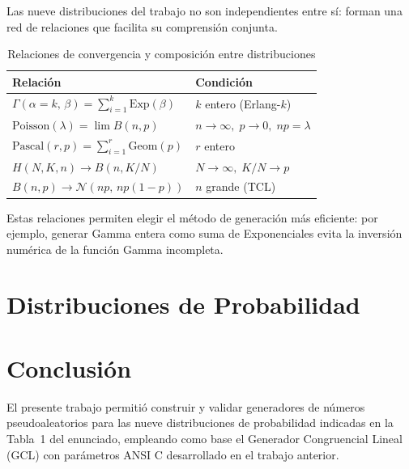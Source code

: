 \documentclass[a4paper, 11pt]{article}
\begin{document}
Las nueve distribuciones del trabajo no son independientes entre sí: forman una red
de relaciones que facilita su comprensión conjunta.

\begin{table}[H]
\centering
\begin{tabular}{ll}
\toprule
\textbf{Relación} & \textbf{Condición} \\
\midrule
$\Gamma(\alpha=k,\,\beta) = \sum_{i=1}^k \text{Exp}(\beta)$ &
    $k$ entero (Erlang-$k$) \\
$\text{Poisson}(\lambda) = \lim B(n, p)$ &
    $n \to \infty,\; p \to 0,\; np = \lambda$ \\
$\text{Pascal}(r, p) = \sum_{i=1}^r \text{Geom}(p)$ &
    $r$ entero \\
$H(N, K, n) \to B(n, K/N)$ &
    $N \to \infty,\; K/N \to p$ \\
$B(n, p) \to \mathcal{N}(np,\, np(1-p))$ &
    $n$ grande (TCL) \\
\bottomrule
\end{tabular}
\caption{Relaciones de convergencia y composición entre distribuciones}
\end{table}

Estas relaciones permiten elegir el método de generación más eficiente: por ejemplo,
generar Gamma entera como suma de Exponenciales evita la inversión numérica de la
función Gamma incompleta.

\newpage
\section{Distribuciones de Probabilidad}



\newpage
\section{Conclusión}

El presente trabajo permitió construir y validar generadores de números pseudoaleatorios
para las nueve distribuciones de probabilidad indicadas en la Tabla~1 del enunciado,
empleando como base el Generador Congruencial Lineal (GCL) con parámetros ANSI C
desarrollado en el trabajo anterior.
\end{document}
